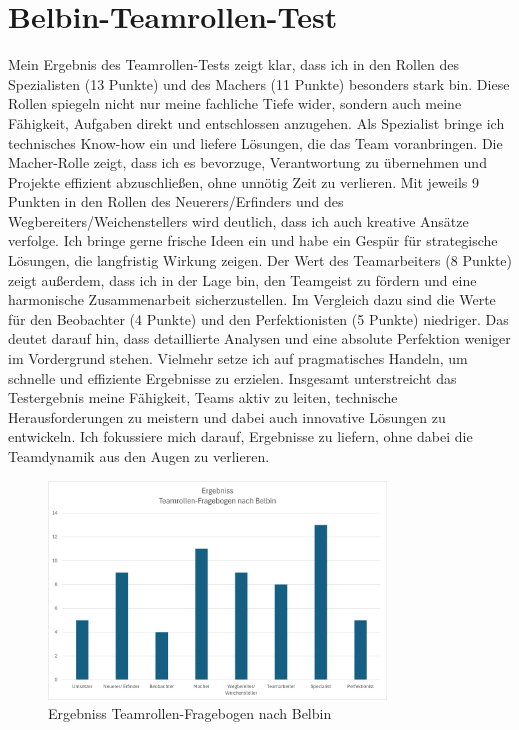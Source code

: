 \section{Belbin-Teamrollen-Test}
Mein Ergebnis des Teamrollen-Tests zeigt klar, dass ich in den Rollen des Spezialisten (13 Punkte) und des Machers (11 Punkte) besonders stark bin. Diese Rollen spiegeln nicht nur meine fachliche Tiefe wider, sondern auch meine Fähigkeit, Aufgaben direkt und entschlossen anzugehen. Als Spezialist bringe ich technisches Know-how ein und liefere Lösungen, die das Team voranbringen. Die Macher-Rolle zeigt, dass ich es bevorzuge, Verantwortung zu übernehmen und Projekte effizient abzuschließen, ohne unnötig Zeit zu verlieren.
Mit jeweils 9 Punkten in den Rollen des Neuerers/Erfinders und des Wegbereiters/Weichenstellers wird deutlich, dass ich auch kreative Ansätze verfolge. Ich bringe gerne frische Ideen ein und habe ein Gespür für strategische Lösungen, die langfristig Wirkung zeigen. Der Wert des Teamarbeiters (8 Punkte) zeigt außerdem, dass ich in der Lage bin, den Teamgeist zu fördern und eine harmonische Zusammenarbeit sicherzustellen.
Im Vergleich dazu sind die Werte für den Beobachter (4 Punkte) und den Perfektionisten (5 Punkte) niedriger. Das deutet darauf hin, dass detaillierte Analysen und eine absolute Perfektion weniger im Vordergrund stehen. Vielmehr setze ich auf pragmatisches Handeln, um schnelle und effiziente Ergebnisse zu erzielen.
Insgesamt unterstreicht das Testergebnis meine Fähigkeit, Teams aktiv zu leiten, technische Herausforderungen zu meistern und dabei auch innovative Lösungen zu entwickeln. Ich fokussiere mich darauf, Ergebnisse zu liefern, ohne dabei die Teamdynamik aus den Augen zu verlieren.

\begin{figure}[H]
	\begin{center}
		\includegraphics[width=0.8\textwidth]{Pictures/ErgebnisBelbin.png}
    \end{center}
	\caption[Ergebniss Teamrollen-Fragebogen nach Belbin]{Ergebniss Teamrollen-Fragebogen nach Belbin}
	\label{fig:ErgebnisBelbin}
\end{figure}

\newpage
